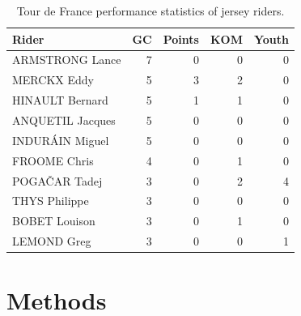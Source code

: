 \documentclass[9pt,twocolumn,twoside]{pnas-report}
\begin{document}
\begin{table}[ht]
\centering
\begin{tabular}{|l|r|r|r|r|}
\hline
\textbf{Rider} & \textbf{GC} & \textbf{Points} & \textbf{KOM} & \textbf{Youth} \\
\hline
ARMSTRONG Lance   & 7 & 0 & 0 & 0 \\
MERCKX Eddy       & 5 & 3 & 2 & 0 \\
HINAULT Bernard   & 5 & 1 & 1 & 0 \\
ANQUETIL Jacques  & 5 & 0 & 0 & 0 \\
INDURÁIN Miguel   & 5 & 0 & 0 & 0 \\
FROOME Chris      & 4 & 0 & 1 & 0 \\
POGAČAR Tadej     & 3 & 0 & 2 & 4 \\
THYS Philippe     & 3 & 0 & 0 & 0 \\
BOBET Louison     & 3 & 0 & 1 & 0 \\
LEMOND Greg       & 3 & 0 & 0 & 1 \\
\hline
\end{tabular}
\caption{Tour de France performance statistics of jersey riders.}
\label{tab:tdf_stats_2}
\end{table}



\section*{Methods}
\end{document}
